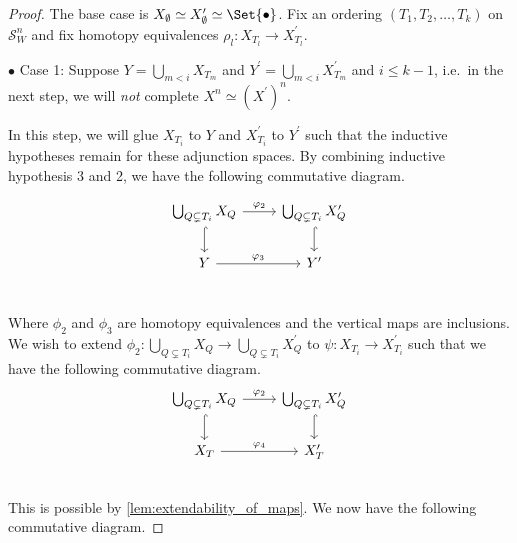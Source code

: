 \documentclass[class=article, crop=false]{standalone}
\begin{document}
\begin{proof}
    The base case is $X_\emptyset \simeq X^\prime_\emptyset \simeq \Set{\bullet}$. Fix an ordering $(T_1, T_2, \ldots , T_k)$ on $\mathcal{S}^n_W$ and fix homotopy equivalences $\rho_l \colon X_{T_l} \to X^\prime_{T_l}$.

    $\bullet$ Case 1: Suppose $Y = \bigcup_{m < i} X_{T_m}$ and $Y^\prime = \bigcup_{m < i} X^\prime_{T_m}$ and $i\leq k-1$, i.e.~in the next step, we will \emph{not} complete $X^n \simeq (X^\prime)^n$.

    In this step, we will glue $X_{T_{i}}$ to $Y$ and $X^\prime_{T_{i}}$ to $Y^\prime$ such that the inductive hypotheses remain for these adjunction spaces.
    By combining inductive hypothesis 3 and 2, we have the following commutative diagram.

    \begin{equation}
        \begin{tikzcd}
\bigcup_{Q \subsetneq T_i} X_{Q} \ar[r, "\phi_2" ] \ar[d, hookrightarrow]     &   \bigcup_{Q \subsetneq T_i} X^\prime_{Q}  \ar[d, hookrightarrow]       \\
Y  \ar[r, "\phi_3"]                                                                 &   Y^\prime                                                  \\
        \end{tikzcd}
        \label{eqn:commutative_Y_inductive_hyp}  
    \end{equation}

    Where $\phi_2$ and $\phi_3$ are homotopy equivalences and the vertical maps are inclusions. We wish to extend $\phi_2 \colon \bigcup_{Q \subsetneq T_i} X_{Q} \to \bigcup_{Q \subsetneq T_i} X^\prime_{Q}$ to $\psi \colon X_{T_i} \to X^\prime_{T_i}$ such that we have the following commutative diagram.
    \begin{equation*}
        \begin{tikzcd}
\bigcup_{Q \subsetneq T_i} X_{Q}  \ar[r, "\phi_2"]             &   \bigcup_{Q \subsetneq T_i} X^\prime_{Q}                                  \\
X_T \ar[r, "\phi_4" ] \ar[from = u, hookrightarrow]                                  &   X^\prime_T  \ar[from = u, hookrightarrow]      \\
        \end{tikzcd}
    \end{equation*}
    This is possible by \cref{lem:extendability_of_maps}. We now have the following commutative diagram.


\end{proof}
\end{document}
